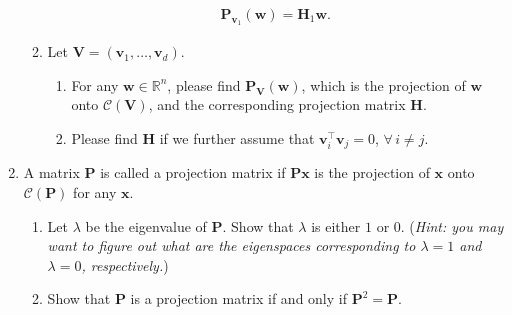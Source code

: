 \documentclass[11pt,letter,notitlepage]{article}
\newcommand{\proj}[2]{\textbf{P}_{#2} (#1)}
\begin{document}
\begin{exercise}
\begin{enumerate}
\begin{enumerate}
			            \begin{align*}
				            \proj{\mathbf{w}}{\mathbf{v}_1}=\mathbf{H}_1\mathbf{w}.
			            \end{align*}
			      \item Let $\mathbf{V}=(\mathbf{v}_1,\ldots,\mathbf{v}_d)$.
			            \begin{enumerate}
				            \item For any $\mathbf{w}\in \mathbb{R}^n$, please find              $\proj{\mathbf{w}}{\mathbf{V}}$, which is the projection of $\mathbf{w}$ onto $\mathcal{C}(\mathbf{V})$, and the corresponding projection matrix $\mathbf{H}$.
				            \item Please find $\mathbf{H}$ if we further assume that $\mathbf{v}_i^{\top}\mathbf{v}_j=0$, $\forall\,i\neq j$.
			            \end{enumerate}
		      \end{enumerate}
		\item A matrix $\mathbf{P}$ is called a projection matrix if $\mathbf{P}\mathbf{x}$ is the projection of $\mathbf{x}$ onto $\mathcal{C}(\mathbf{P})$ for any $\mathbf{x}$.
		      \begin{enumerate}
			      \item Let $\lambda$ be the eigenvalue of $\mathbf{P}$. Show that $\lambda$ is either $1$ or $0$. (\emph{Hint: you may want to figure out what are the eigenspaces corresponding to $\lambda=1$ and $\lambda=0$, respectively.})
			      \item Show that $\mathbf{P}$ is a projection matrix if and only if $\mathbf{P}^2 = \mathbf{P}$.
		      \end{enumerate}
	\end{enumerate}
\end{exercise}
\end{document}
